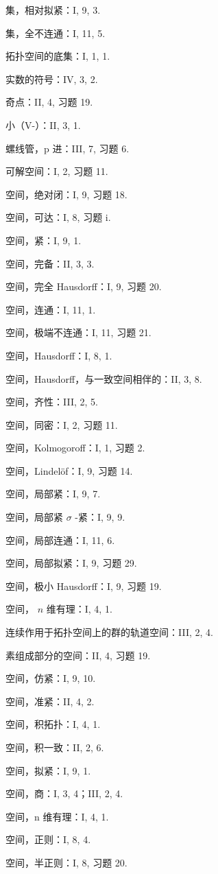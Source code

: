集，相对拟紧：I, 9, 3.

集，全不连通：I, 11, 5.

拓扑空间的底集：I, 1, 1.

实数的符号：IV, 3, 2.

奇点：II, 4, 习题 19.

小（V-）：II, 3, 1.

螺线管，p 进：III, 7, 习题 6.

可解空间：I, 2, 习题 11.

空间，绝对闭：I, 9, 习题 18.

空间，可达：I, 8, 习题 i.

空间，紧：I, 9, 1.

空间，完备：II, 3, 3.

空间，完全 Hausdorff：I, 9, 习题 20.

空间，连通：I, 11, 1.

空间，极端不连通：I, 11, 习题 21.

空间，Hausdorff：I, 8, 1.

空间，Hausdorff，与一致空间相伴的：II, 3, 8.

空间，齐性：III, 2, 5.

空间，同密：I, 2, 习题 11.

空间，Kolmogoroff：I, 1, 习题 2.

空间，Lindelöf：I, 9, 习题 14.

空间，局部紧：I, 9, 7.

空间，局部紧 \(\sigma\) -紧：I, 9, 9.

空间，局部连通：I, 11, 6.

空间，局部拟紧：I, 9, 习题 29.

空间，极小 Hausdorff：I, 9, 习题 19.

空间， \(n\) 维有理：I, 4, 1.

连续作用于拓扑空间上的群的轨道空间：III, 2, 4.

素组成部分的空间：II, 4, 习题 19.

空间，仿紧：I, 9, 10.

空间，准紧：II, 4, 2.

空间，积拓扑：I, 4, 1.

空间，积一致：II, 2, 6.

空间，拟紧：I, 9, 1.

空间，商：I, 3, 4；III, 2, 4.

空间，n 维有理：I, 4, 1.

空间，正则：I, 8, 4.

空间，半正则：I, 8, 习题 20.

